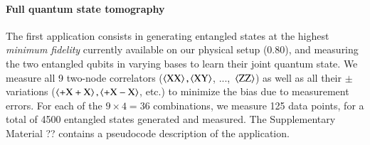 \paragraph{Full quantum state tomography}

The first application consists in generating entangled states at the highest \emph{minimum fidelity}
currently available on our physical setup (\num{0.80}), and measuring the two entangled qubits in
varying bases to learn their joint quantum state. We measure all \num{9} two-node correlators
($\braket{\mathrm{XX}}, \braket{\mathrm{XY}}$, ...,~$\braket{\mathrm{ZZ}}$) as well as all their
$\pm$ variations ($\braket{\mathrm{+X+X}}, \braket{\mathrm{+X-X}}$, etc.) to minimize the bias due
to measurement errors. For each of the $9 \times 4 = 36$ combinations, we measure \num{125} data
points, for a total of \num{4500} entangled states generated and measured. The Supplementary
Material ?? contains a pseudocode description of the application.

